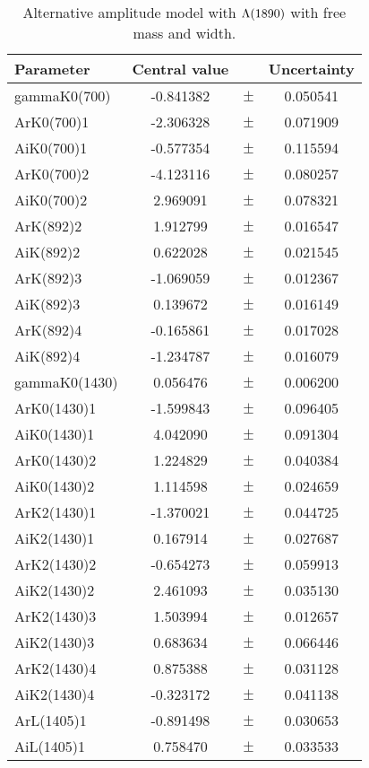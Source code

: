 \clearpage

\begin{table}
\centering
\caption{Alternative amplitude model with ${\Lambda}(1890)$ with free mass and width.}
\begin{tiny}
\begin{tabular}{lccc}
\toprule
Parameter & Central value & & Uncertainty\\
\midrule 
gammaK0(700) & -0.841382 & $\pm$ & 0.050541 \\
ArK0(700)1 & -2.306328 & $\pm$ & 0.071909 \\
AiK0(700)1 & -0.577354 & $\pm$ & 0.115594 \\
ArK0(700)2 & -4.123116 & $\pm$ & 0.080257 \\
AiK0(700)2 & 2.969091 & $\pm$ & 0.078321 \\
ArK(892)2 & 1.912799 & $\pm$ & 0.016547 \\
AiK(892)2 & 0.622028 & $\pm$ & 0.021545 \\
ArK(892)3 & -1.069059 & $\pm$ & 0.012367 \\
AiK(892)3 & 0.139672 & $\pm$ & 0.016149 \\
ArK(892)4 & -0.165861 & $\pm$ & 0.017028 \\
AiK(892)4 & -1.234787 & $\pm$ & 0.016079 \\
gammaK0(1430) & 0.056476 & $\pm$ & 0.006200 \\
ArK0(1430)1 & -1.599843 & $\pm$ & 0.096405 \\
AiK0(1430)1 & 4.042090 & $\pm$ & 0.091304 \\
ArK0(1430)2 & 1.224829 & $\pm$ & 0.040384 \\
AiK0(1430)2 & 1.114598 & $\pm$ & 0.024659 \\
ArK2(1430)1 & -1.370021 & $\pm$ & 0.044725 \\
AiK2(1430)1 & 0.167914 & $\pm$ & 0.027687 \\
ArK2(1430)2 & -0.654273 & $\pm$ & 0.059913 \\
AiK2(1430)2 & 2.461093 & $\pm$ & 0.035130 \\
ArK2(1430)3 & 1.503994 & $\pm$ & 0.012657 \\
AiK2(1430)3 & 0.683634 & $\pm$ & 0.066446 \\
ArK2(1430)4 & 0.875388 & $\pm$ & 0.031128 \\
AiK2(1430)4 & -0.323172 & $\pm$ & 0.041138 \\
ArL(1405)1 & -0.891498 & $\pm$ & 0.030653 \\
AiL(1405)1 & 0.758470 & $\pm$ & 0.033533 \\

\end{tabular}
\end{tiny}
\end{table}
